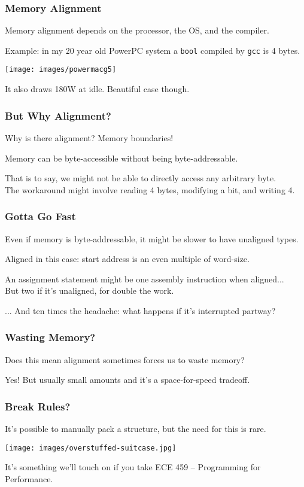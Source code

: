 \begin{frame}
\frametitle{Memory Alignment}

Memory alignment depends on the processor, the OS, and the compiler.

Example: in my 20 year old PowerPC system a \texttt{bool} compiled by \texttt{gcc} is 4 bytes.

\begin{center}
  \texttt{[image: images/powermacg5]}
\end{center}

It also draws 180W at idle. Beautiful case though.
\end{frame}

\begin{frame}
\frametitle{But Why Alignment?}

Why is there alignment? Memory boundaries!

Memory can be byte-accessible without being \alert{byte-addressable}.

That is to say, we might not be able to directly access any arbitrary byte.\\
\quad The workaround might involve reading 4 bytes, modifying a bit, and writing 4.

\end{frame}

\begin{frame}
\frametitle{Gotta Go Fast}

Even if memory is byte-addressable, it might be slower to have unaligned types.

Aligned in this case: start address is an even multiple of word-size.

An assignment statement might be one assembly instruction when aligned...\\
\quad But two if it's unaligned, for double the work.

... And ten times the headache: what happens if it's interrupted partway?

\end{frame}

\begin{frame}
\frametitle{Wasting Memory?}

Does this mean alignment sometimes forces us to waste memory?

Yes! But usually small amounts and it's a space-for-speed tradeoff.

\end{frame}

\begin{frame}
\frametitle{Break Rules?}

It's possible to manually pack a structure, but the need for this is rare.

\begin{center}
  \texttt{[image: images/overstuffed-suitcase.jpg]}
\end{center}

It's something we'll touch on if you take ECE 459 -- Programming for Performance.

\end{frame}

